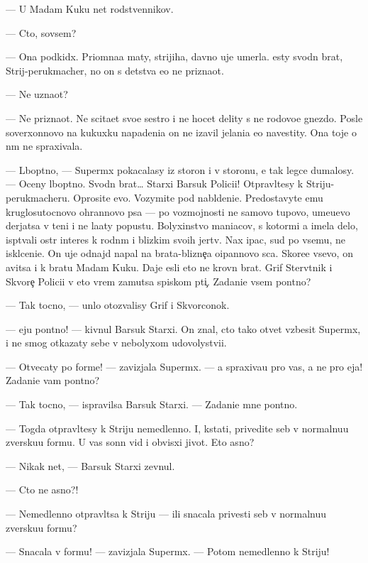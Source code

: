 \documentclass[12pt]{book}
\begin{document}
— U Madam Kuku net rodstvennikov.

— Cto, sovsem?

— Ona podkid{\yi}x. Pri{\y}omna{\y}a maty, strijiha, davno uje umerla. {\Y}esty svodn{\yi}{\y} brat, Strij-perukmacher, no on s detstva {\y}e{\y}o ne prizna{\y}ot.

— Ne uzna{\y}ot?

— Ne prizna{\y}ot. Ne scita{\y}et svo{\y}e{\y} sestro{\y} i ne hocet delity s ne{\y} rodovo{\y}e gnezdo. Posle soverxonnovo na kukuxku napadeni{\y}a on ne iz{\y}avil jelani{\y}a {\y}e{\y}o navestity. Ona toje o n{\e}m ne spraxivala.

— L{\iu}bop{\yi}tno, — Superm{\yi}x pokacalasy iz storon{\yi} i v storonu, {\y}e{\y} tak legce dumalosy. — Oceny l{\iu}bop{\yi}tno. Svodn{\yi}{\y} brat… Starxi{\y} Barsuk Polici{\y}i! Otpravl{\ia}{\y}tesy k Striju-perukmacheru. Oprosite {\y}evo. Vozymite pod nabl{\iu}deni{\y}e. Predostavyte {\y}emu kruglosutocnovo ohrannovo psa — po vozmojnosti ne samovo tupovo, ume{\y}u{\x}evo derjatsa v teni i ne la{\y}aty popustu. Bolyxinstvo maniacov, s kotor{\yi}mi {\y}a imela delo, isp{\yi}t{\yi}vali ostr{\yi}{\y} interes k rodn{\yi}m i blizkim svo{\y}ih jertv. Nax {\X}ipac, sud{\ia} po vsemu, ne iskl{\iu}ceni{\y}e. On uje od\-naj\-d{\yi} napal na brata-blizne{\c}a o{\x}ipannovo s{\yi}ca. Skore{\y}e vsevo, on {\y}avitsa i k bratu Madam Kuku. Daje {\y}esli eto ne krovn{\yi}{\y} brat. Grif Sterv{\ia}tnik i Skvore{\c} Polici{\y}i v eto vrem{\ia} za{\y}mutsa spiskom pti{\c}. Zadani{\y}e vsem pon{\ia}tno?

— Tak tocno, — un{\yi}lo otozvalisy Grif i Skvorconok.

— {\Y}eju pon{\ia}tno! — kivnul Barsuk Starxi{\y}. On znal, cto tako{\y} otvet vzbesit Superm{\yi}x, i ne smog otkazaty sebe v nebolyxom udovolystvi{\y}i.

— Otvecaty po forme! — zavizjala Superm{\yi}x. — {\Y}a spraxiva{\y}u pro vas, a ne pro {\y}eja! Zadani{\y}e vam pon{\ia}tno?

— Tak tocno, — ispravilsa Barsuk Starxi{\y}. — Zadani{\y}e mne pon{\ia}tno.

— Togda otpravl{\ia}{\y}tesy k Striju nemedlenno. I, kstati, privedite seb{\ia} v normalnu{\y}u zversku{\y}u formu. U vas sonn{\yi}{\y} vid i obvisxi{\y} jivot. Eto {\y}asno?

— Nikak net, — Barsuk Starxi{\y} zevnul.

— Cto ne {\y}asno?!

— Nemedlenno otpravl{\ia}tsa k Striju — ili snacala privesti seb{\ia} v nor\-mal\-nu\-{\y}u zversku{\y}u formu?

— Snacala v formu! — zavizjala Superm{\yi}x. — Potom nemedlenno k Striju!
\end{document}
